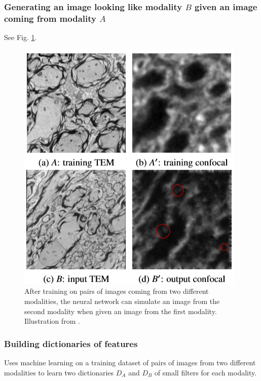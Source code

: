 \documentclass[11pt]{article} %
\begin{document}
    \subsubsection{Generating an image looking like modality $B$ given an image coming from modality $A$ \cite{hertzmann:analogies}}See Fig. \ref{fig:analogies}.
\begin{figure}[h!]
  \centering
  \includegraphics[width=0.60 \linewidth]{analogies.png}
  \caption{After training on pairs of images coming from two different modalities, the neural network can simulate an image from the second modality when given an image from the first modality. Illustration from \cite{cao:analogies}.}
  \label{fig:analogies}
\end{figure}
    \subsubsection{Building dictionaries of features \cite{cao:analogies}}
Uses machine learning on a training dataset of pairs of images from two different modalities to learn two dictionaries $D_A$ and $D_B$ of small filters for each modality.
\end{document}
